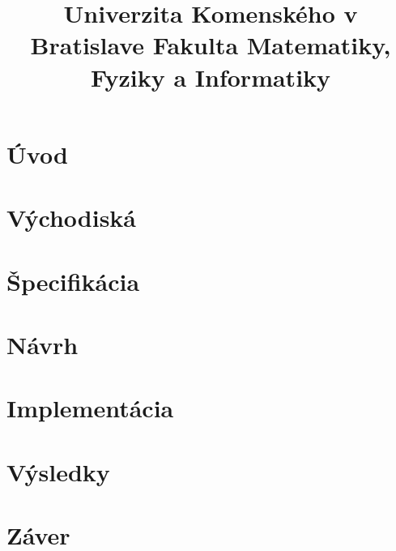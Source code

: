 \documentclass[12pt,a4paper]{bachelor}
\title{Univerzita Komenského v Bratislave Fakulta Matematiky, Fyziky a Informatiky}
\author{\autor}
\begin{document}



\tableofcontents
\newpage

\chapter*{Úvod}


\chapter{Východiská}


\chapter{Špecifikácia}


\chapter{Návrh}


\chapter{Implementácia}


\chapter{Výsledky}


\chapter*{Záver}


\printbibliography

\label{totalpages}
\end{document}

